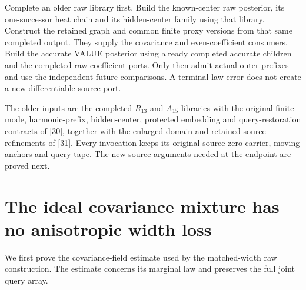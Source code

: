 \documentclass[11pt]{article}
\numberwithin{equation}{section}
\theoremstyle{remark}\newtheorem{remark}[theorem]{Remark}
\begin{document}
Complete an older raw library first. Build the known-center raw posterior, its one-successor heat chain and its hidden-center family using that library. Construct the retained graph and common finite proxy versions from that same completed output. They supply the covariance and even-coefficient consumers. Build the accurate VALUE posterior using already completed accurate children and the completed raw coefficient ports. Only then admit actual outer prefixes and use the independent-future comparisons. A terminal law error does not create a new differentiable source port.

The older inputs are the completed $R_{13}$ and $A_{15}$ libraries with the original finite-mode, harmonic-prefix, hidden-center, protected embedding and query-restoration contracts of [30], together with the enlarged domain and retained-source refinements of [31]. Every invocation keeps its original source-zero carrier, moving anchors and query tape. The new source arguments needed at the endpoint are proved next.

\section{The ideal covariance mixture has no anisotropic width loss}
\label{sec:field-mixture}
We first prove the covariance-field estimate used by the matched-width raw construction. The estimate concerns its marginal law and preserves the full joint query array.
\end{document}
